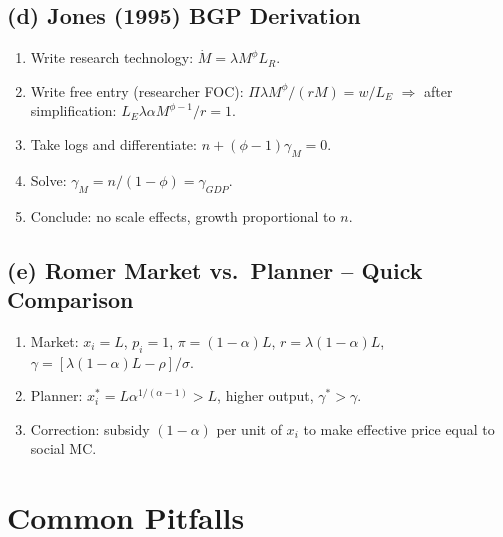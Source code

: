 \documentclass[a4paper,11pt]{article}
\begin{document}
\subsection*{(d) Jones (1995) BGP Derivation}

\begin{enumerate}
    \item Write research technology: $\dot{M} = \lambda M^\phi L_R$.
    \item Write free entry (researcher FOC): $\Pi \lambda M^{\phi} / (rM) = w/L_E$ $\Rightarrow$ after simplification: $L_E \lambda \alpha M^{\phi - 1}/r = 1$.
    \item Take logs and differentiate: $n + (\phi-1)\gamma_M = 0$.
    \item Solve: $\gamma_M = n/(1-\phi) = \gamma_{GDP}$.
    \item Conclude: no scale effects, growth proportional to $n$.
\end{enumerate}

\subsection*{(e) Romer Market vs.\ Planner -- Quick Comparison}

\begin{enumerate}
    \item Market: $x_i = L$, $p_i = 1$, $\pi = (1-\alpha)L$, $r = \lambda(1-\alpha)L$, $\gamma = [\lambda(1-\alpha)L - \rho]/\sigma$.
    \item Planner: $x_i^* = L\alpha^{1/(\alpha-1)} > L$, higher output, $\gamma^* > \gamma$.
    \item Correction: subsidy $(1 - \alpha)$ per unit of $x_i$ to make effective price equal to social MC.
\end{enumerate}

\clearpage

\section{Common Pitfalls}
\end{document}
